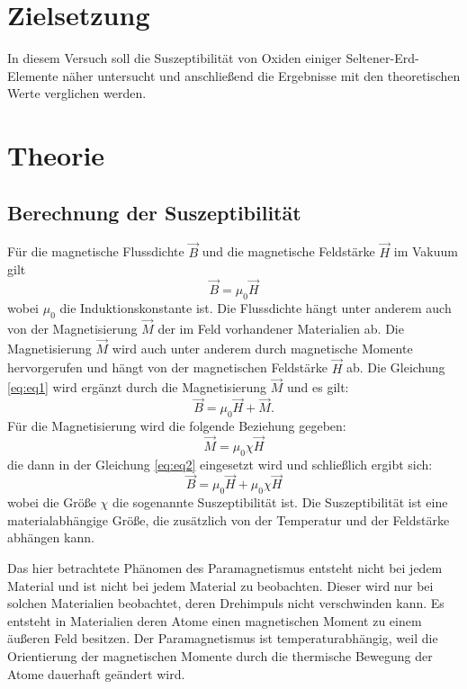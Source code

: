 \section{Zielsetzung}
\label{sec:Zielsetzung}

In diesem Versuch soll die Suszeptibilität von Oxiden einiger Seltener-Erd-Elemente näher untersucht und anschließend die Ergebnisse mit den theoretischen Werte verglichen werden.

\section{Theorie}
\label{sec:Theorie}
\subsection{Berechnung der Suszeptibilität}
\label{subsec: Berechnung}
Für die magnetische Flussdichte $\vec{B}$ und die magnetische Feldstärke $\vec{H}$ im Vakuum gilt 
\begin{equation}
\label{eq:eq1}
\vec{B} = \mu_0 \vec{H}
\end{equation}
wobei $\mu_0$ die Induktionskonstante ist. Die Flussdichte hängt unter anderem auch von der Magnetisierung $\vec{M}$ der im Feld vorhandener Materialien ab. Die Magnetisierung $\vec{M}$ wird auch unter anderem durch magnetische Momente hervorgerufen und hängt von der magnetischen Feldstärke $\vec{H}$ ab.
Die Gleichung \ref{eq:eq1} wird ergänzt durch die Magnetisierung $\vec{M}$ und es gilt:
\begin{equation}
\label{eq:eq2}
\vec{B} = \mu_0 \vec{H} + \vec{M}.
\end{equation}
Für die Magnetisierung wird die folgende Beziehung gegeben:
\begin{equation}
\vec{M} = \mu_0 \chi \vec{H}
\end{equation}
die dann in der Gleichung \ref{eq:eq2} eingesetzt wird und schließlich ergibt sich:
\begin{equation*}
\vec{B} = \mu_0 \vec{H} + \mu_0 \chi \vec{H}
\end{equation*}
wobei die Größe $\chi$ die sogenannte Suszeptibilität ist. Die Suszeptibilität ist eine materialabhängige Größe, die zusätzlich von der Temperatur und der Feldstärke abhängen kann. 

Das hier betrachtete Phänomen des Paramagnetismus entsteht nicht bei jedem Material und ist nicht bei jedem Material zu beobachten. Dieser wird nur bei solchen Materialien beobachtet, deren Drehimpuls nicht verschwinden kann. Es entsteht in Materialien deren Atome einen magnetischen Moment zu einem äußeren Feld besitzen. Der Paramagnetismus ist temperaturabhängig, weil die Orientierung der magnetischen Momente durch die thermische Bewegung der Atome dauerhaft geändert wird.

